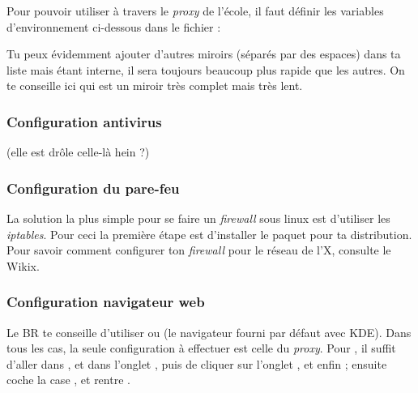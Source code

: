 \noindent {}

\label{gentoo_mirror} Pour pouvoir utiliser  \`a travers le \emph{proxy} de l'\'ecole, il faut d\'efinir les variables d'environnement
ci-dessous dans le fichier  :


Tu peux \'evidemment ajouter d'autres miroirs (s\'epar\'es par des espaces) dans ta liste mais
 \'etant interne, il sera toujours beaucoup plus rapide que les autres. On te
conseille ici  qui est un miroir tr\`es complet mais tr\`es lent.



\subsubsection{Configuration antivirus}
\footnotesize{(elle est dr\^ole celle-l\`a hein ?)}

\subsubsection{Configuration du pare-feu}

La solution la plus simple pour se faire un \emph{firewall} sous linux est d'utiliser les \emph{iptables}. Pour ceci la premi\`ere \'etape est
d'installer le paquet  pour ta distribution. Pour savoir comment configurer ton \emph{firewall} pour le r\'eseau de l'X, consulte le Wikix.

\subsubsection{Configuration navigateur web}

 Le BR te conseille d'utiliser  ou
 (le navigateur fourni par d\'efaut avec KDE). Dans tous les cas, la seule
configuration \`a effectuer est celle du \emph{proxy}. Pour , il suffit d'aller dans
,  et dans l'onglet , puis de cliquer sur l'onglet
, et enfin  ; ensuite coche la case , et rentre .

